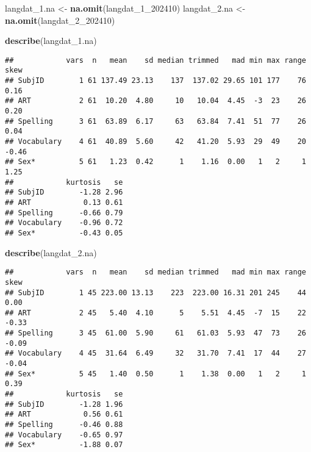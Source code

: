 \documentclass[
]{article}
\newenvironment{Shaded}{\begin{snugshade}}{\end{snugshade}}
\newcommand{\FunctionTok}[1]{\textcolor[rgb]{0.13,0.29,0.53}{\textbf{#1}}}
\newcommand{\NormalTok}[1]{#1}
\newcommand{\OtherTok}[1]{\textcolor[rgb]{0.56,0.35,0.01}{#1}}
\begin{document}
\begin{Shaded}
\begin{Highlighting}[]
\NormalTok{langdat\_1.na }\OtherTok{\textless{}{-}} \FunctionTok{na.omit}\NormalTok{(langdat\_1\_202410)}
\NormalTok{langdat\_2.na }\OtherTok{\textless{}{-}} \FunctionTok{na.omit}\NormalTok{(langdat\_2\_202410)}

\FunctionTok{describe}\NormalTok{(langdat\_1.na)}
\end{Highlighting}
\end{Shaded}

\begin{verbatim}
##            vars  n   mean    sd median trimmed   mad min max range  skew
## SubjID        1 61 137.49 23.13    137  137.02 29.65 101 177    76  0.16
## ART           2 61  10.20  4.80     10   10.04  4.45  -3  23    26  0.20
## Spelling      3 61  63.89  6.17     63   63.84  7.41  51  77    26  0.04
## Vocabulary    4 61  40.89  5.60     42   41.20  5.93  29  49    20 -0.46
## Sex*          5 61   1.23  0.42      1    1.16  0.00   1   2     1  1.25
##            kurtosis   se
## SubjID        -1.28 2.96
## ART            0.13 0.61
## Spelling      -0.66 0.79
## Vocabulary    -0.96 0.72
## Sex*          -0.43 0.05
\end{verbatim}

\begin{Shaded}
\begin{Highlighting}[]
\FunctionTok{describe}\NormalTok{(langdat\_2.na)}
\end{Highlighting}
\end{Shaded}

\begin{verbatim}
##            vars  n   mean    sd median trimmed   mad min max range  skew
## SubjID        1 45 223.00 13.13    223  223.00 16.31 201 245    44  0.00
## ART           2 45   5.40  4.10      5    5.51  4.45  -7  15    22 -0.33
## Spelling      3 45  61.00  5.90     61   61.03  5.93  47  73    26 -0.09
## Vocabulary    4 45  31.64  6.49     32   31.70  7.41  17  44    27 -0.04
## Sex*          5 45   1.40  0.50      1    1.38  0.00   1   2     1  0.39
##            kurtosis   se
## SubjID        -1.28 1.96
## ART            0.56 0.61
## Spelling      -0.46 0.88
## Vocabulary    -0.65 0.97
## Sex*          -1.88 0.07
\end{verbatim}
\end{document}
